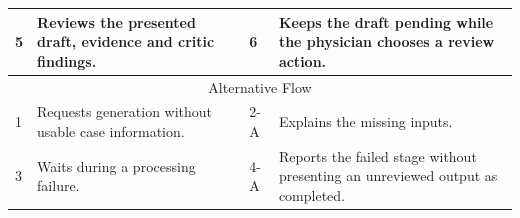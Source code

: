\begin{table}[htbp]
\begin{tabular}{|p{}|p{}|p{}|p{}|p{}|}
5 & \multicolumn{2}{p{\dimexpr0.37\textwidth+2\tabcolsep+\arrayrulewidth\relax}|}{Reviews the presented draft, evidence and critic findings.} & 6 & Keeps the draft pending while the physician chooses a review action. \\ \hline
\multicolumn{5}{|c|}{Alternative Flow} \\ \hline
1 & \multicolumn{2}{p{\dimexpr0.37\textwidth+2\tabcolsep+\arrayrulewidth\relax}|}{Requests generation without usable case information.} & 2-A & Explains the missing inputs. \\ \hline
3 & \multicolumn{2}{p{\dimexpr0.37\textwidth+2\tabcolsep+\arrayrulewidth\relax}|}{Waits during a processing failure.} & 4-A & Reports the failed stage without presenting an unreviewed output as completed. \\ \hline
\end{tabular}
\end{table}

